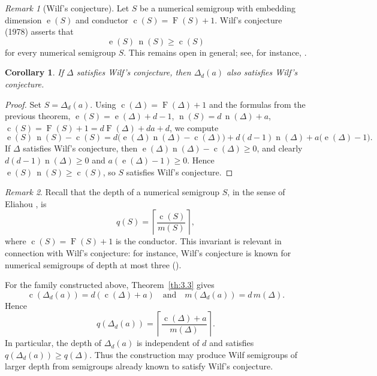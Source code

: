 \documentclass[12pt,a4paper]{amsart}
\newtheorem{corollary}[theorem]{Corollary}
\theoremstyle{definition}
\theoremstyle{remark}
\newtheorem*{remark}{Remark}
\begin{document}
\begin{remark}[Wilf's conjecture]
Let $S$ be a numerical semigroup with embedding dimension $\operatorname{e}(S)$ and conductor $\operatorname{c}(S)=\operatorname{F}(S)+1$. 
Wilf's conjecture (1978) asserts that
\[
\operatorname{e}(S)\,\operatorname{n}(S)\ge \operatorname{c}(S)
\]
for every numerical semigroup $S$. This remains open in general; see, for instance, \cite{EliahouWilf}.
\end{remark}

\begin{corollary}\label{cor:wilf-preserved}
If $\Delta$ satisfies Wilf's conjecture, then $\Delta_d(a)$ also satisfies Wilf's conjecture.
\end{corollary}

\begin{proof}
Set $S = \Delta_d(a)$. Using $\operatorname{c}(\Delta)=\operatorname{F}(\Delta)+1$ and the formulas from the previous theorem, $\operatorname{e}(S)=\operatorname{e}(\Delta)+d-1$, $\operatorname{n}(S)=d\,\operatorname{n}(\Delta)+a$, $\operatorname{c}(S)=\operatorname{F}(S)+1=d\operatorname{F}(\Delta)+da+d$, we compute
\[
\operatorname{e}(S)\,\operatorname{n}(S)-\operatorname{c}(S)
= d\bigl(\operatorname{e}(\Delta)\operatorname{n}(\Delta)-\operatorname{c}(\Delta)\bigr)+d(d-1)\operatorname{n}(\Delta)+a\bigl(\operatorname{e}(\Delta)-1\bigr).
\]
If $\Delta$ satisfies Wilf's conjecture, then $\operatorname{e}(\Delta)\operatorname{n}(\Delta)-\operatorname{c}(\Delta)\ge 0$, and clearly $d(d-1)\operatorname{n}(\Delta)\ge 0$ and $a(\operatorname{e}(\Delta)-1)\ge 0$. Hence
$\operatorname{e}(S)\,\operatorname{n}(S)\ge \operatorname{c}(S)$, so $S$ satisfies Wilf's conjecture.
\end{proof}

\begin{remark}
Recall that the depth of a numerical semigroup $S$, in the sense of Eliahou \cite{EliahouFromentin}, is
\[
q(S)=\left\lceil \frac{\operatorname{c}(S)}{m(S)}\right\rceil,
\]
where $\operatorname{c}(S)=\operatorname{F}(S)+1$ is the conductor. This invariant is relevant in connection with
Wilf's conjecture: for instance, Wilf's conjecture is known for numerical semigroups of
depth at most three (\cite{EliahouWilf}).

For the family constructed above, Theorem~\ref{th:3.3} gives
\[
\operatorname{c}(\Delta_d(a))=d(\operatorname{c}(\Delta)+a)
\quad\text{and}\quad
m(\Delta_d(a))=d\,m(\Delta).
\]
Hence
\[
q(\Delta_d(a))
=
\left\lceil \frac{\operatorname{c}(\Delta)+a}{m(\Delta)}\right\rceil.
\]
In particular, the depth of $\Delta_d(a)$ is independent of $d$ and satisfies
$q(\Delta_d(a))\ge q(\Delta)$. Thus the construction may produce Wilf semigroups of larger
depth from semigroups already known to satisfy Wilf's conjecture.
\end{remark}
\end{document}
